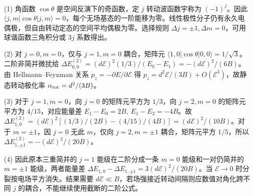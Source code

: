 (1) 角函数 \(\cos\theta\) 是空间反演下的奇函数，定 \(j\) 转动波函数宇称为 \((-1)^j\)。因此 \(\langle j,m|\cos\theta|j,m\rangle=0\)，每个无场基态的一阶能移为零。线性极性分子仍有永久电偶极，但自由转动定态的空间平均偶极为零。选择规则 \(\Delta j=\pm1,\Delta m=0\)，可用球谐函数三角积分或 \(3j\) 系数得出。

(2) 对 \(j=0,m=0\)，仅与 \(j=1,m=0\) 耦合，矩阵元 \(\langle1,0|\cos\theta|0,0\rangle=1/\sqrt3\)。二阶非简并微扰给 \(\Delta E_{0,0}^{(2)}=(d\mathcal E)^2(1/3)/(E_0-E_1)=-(d\mathcal E)^2/(6B)\)。由 Hellmann--Feynman 关系 \(p_z=-\partial E/\partial\mathcal E\) 得 \(p_z=d^2\mathcal E/(3B)+O(\mathcal E^3)\)，故静态转动极化率 \(\alpha_{\rm rot}=d^2/(3B)\)。

(3) 对于 \(j=1,m=0\)，向 \(j=0\) 的矩阵元平方为 \(1/3\)，向 \(j=2,m=0\) 的矩阵元平方为 \(4/15\)，对应能量差 \(E_1-E_0=2B,\ E_1-E_2=-4B\)。故 \(\Delta E_{1,0}^{(2)}=(d\mathcal E)^2[(1/3)/(2B)-(4/15)/(4B)]=(d\mathcal E)^2/(10B)\)。对于 \(m=\pm1\)，因 \(j=0\) 无此 \(m\)，仅向 \(j=2,m=\pm1\) 耦合，矩阵元平方 \(1/5\)，所以 \(\Delta E_{1,\pm1}^{(2)}=-(d\mathcal E)^2/(20B)\)。

(4) 因此原本三重简并的 \(j=1\) 能级在二阶分成一条 \(m=0\) 能级和一对仍简并的 \(m=\pm1\) 能级，两者能量差 \(\Delta E_{1,0}-\Delta E_{1,\pm1}=3(d\mathcal E)^2/(20B)\)。当 \(\mathcal E\to0\) 时分裂按电场平方消失。结果需要 \(d\mathcal E\ll B\)，若场强接近转动间隔则应数值对角化跨不同 \(j\) 的耦合，不能继续使用截断的二阶公式。
